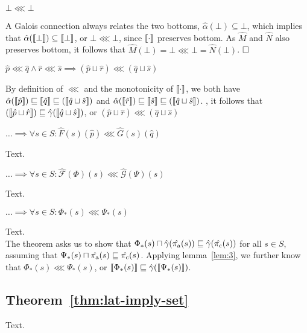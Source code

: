 \begin{lemma} \label{lem:bot-refine-bot}
$\bot \lll \bot$
\end{lemma}

A Galois connection always relates the two bottoms, $\hat \alpha(\bot) \subseteq \bot$, which implies that $\hat \alpha(\llbracket \bot \rrbracket) \subseteq \llbracket \bot \rrbracket$, or $\bot \lll \bot$, since $\llbracket \cdot \rrbracket$ preserves bottom. As $\hat M$ and $\hat N$ also preserves bottom, it follows that $\hat M(\bot) = \bot \lll \bot = \hat N(\bot)$. $\qedbox$

\begin{lemma} \label{lem:closed-join}
$\hat p \lll \hat q \wedge \hat r \lll \hat s \implies (\hat p \sqcup \hat r) \lll (\hat q \sqcup \hat s)$
\end{lemma}

By definition of $\lll$ and the monotonicity of $\llbracket \cdot \rrbracket$, we both have $\hat \alpha(\llbracket \hat p \rrbracket) \sqsubseteq \llbracket \hat q \rrbracket \sqsubseteq (\llbracket \hat q \sqcup \hat s \rrbracket)$ and $\hat \alpha(\llbracket \hat r \rrbracket) \sqsubseteq \llbracket \hat s \rrbracket \sqsubseteq (\llbracket \hat q \sqcup \hat s \rrbracket)$. , it follows that $(\llbracket \hat p \sqcup \hat r \rrbracket) \sqsubseteq \hat \gamma(\llbracket \hat q \sqcup \hat s \rrbracket)$, or $(\hat p \sqcup \hat r) \lll (\hat q \sqcup \hat s)$

\begin{lemma} \label{lem:1}
$\dots \implies \forall s \in S : \hat{F}(s)(\hat p) \lll \hat{G}(s)(\hat q)$
\end{lemma}

Text.

\begin{lemma} \label{lem:2}
$\dots \implies \forall s \in S : \hat{\mathcal{F}}(\Phi)(s) \lll \hat{\mathcal{G}}(\Psi)(s)$
\end{lemma}

Text.

\begin{lemma} \label{lem:3}
$\dots \implies \forall s \in S : \Phi_{*}(s) \lll \Psi_{*}(s)$
\end{lemma}

Text.
\\

The theorem asks us to show that $\Phi_{*}(s) \sqcap \hat{\gamma}(\hat{\operatorname{\pi_{\textrm{a}}}}(s)) \sqsubseteq \hat{\gamma}(\hat{\operatorname{\pi_{\textrm{c}}}}(s))$ for all $s \in S$, assuming that $\Psi_{*}(s) \sqcap \hat{\operatorname{\pi_{\textrm{a}}}}(s) \sqsubseteq \hat{\operatorname{\pi_{\textrm{c}}}}(s)$. Applying lemma~\ref{lem:3}, we further know that $\Phi_{*}(s) \lll \Psi_{*}(s)$, or $\llbracket \Phi_{*}(s) \rrbracket \sqsubseteq \hat{\gamma}(\llbracket \Psi_{*}(s) \rrbracket)$.

\subsection{Theorem~\ref{thm:lat-imply-set}}

Text.
